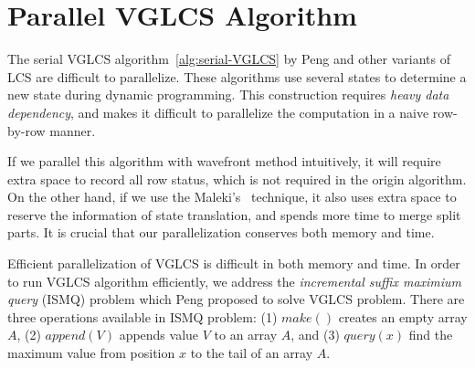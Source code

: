 \section{Parallel VGLCS Algorithm} %
\label{sec:parallelVGLCS}

The serial VGLCS algorithm~\ref{alg:serial-VGLCS} by Peng and other
variants of LCS are difficult to parallelize.  These algorithms use
several states to determine a new state during dynamic programming.
This construction requires {\em heavy data dependency}, and makes it
difficult to parallelize the computation in a naive row-by-row manner.

\iffalse
在 $O(nm \alpha(n))$ 的序列算法 \ref{alg:serial-VGLCS} 中，
我們發現算法如大多數的變型 LCS 相同，依賴數個狀態以轉移當前狀態，
大量的資料依賴性不易於細粒度平行。使用波前運行平行是一種常見的解決方案，
由於這種平行對於運行時的快取不友善 (cache-unfriendly)，
在 Saeed Maleki ~\cite{saeed} 論文中提到如何使用 Rank Convergence 的特殊性質，
拓展出更高平行度來解決動態規劃的相關問題。
\fi




If we parallel this algorithm with wavefront method intuitively, it will
require extra space to record all row status, which is not required in
the origin algorithm.  On the other hand, if we use the
Maleki's~\cite{Maleki2016EfficientPU} technique, it also uses extra
space to reserve the information of state translation, and spends more
time to merge split parts.  It is crucial that our parallelization
conserves both memory and time.

Efficient parallelization of VGLCS is difficult in both memory and time.
In order to run VGLCS algorithm efficiently, we address the {\em
incremental suffix maximium query} (ISMQ) problem which Peng proposed to
solve VGLCS problem.  There are three operations available in ISMQ
problem: (1) $\mathit{make}()$ creates an empty array $A$, (2)
$\mathit{append}(V)$ appends value $V$ to an array $A$, and (3)
$\mathit{query}(x)$ find the maximum value from position $x$ to the tail
of an array $A$.  



\iffalse
Peng 在解決 VGLCS 問題時，提出 Incremental Suffix Maximum Query 
的問題用於算法中，ISMQ 有兩種操作，
\fi

\iffalse 序列算法的空間複雜度為 $O(nm)$。若使用波前平行，需要同時維護橫
向的所有狀態，需要多付出一倍的空間量。若加入 Rank Convergence 的想法拓
展出，勢必要記錄轉移的狀態，需要耗費更多的記憶體空間，用以在最後階段合
併所用。\fi

